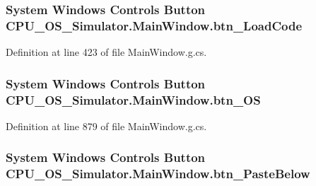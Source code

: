 \subsubsection[{btn\+\_\+\+Load\+Code}]{\setlength{\rightskip}{0pt plus 5cm}System Windows Controls Button C\+P\+U\+\_\+\+O\+S\+\_\+\+Simulator.\+Main\+Window.\+btn\+\_\+\+Load\+Code\hspace{0.3cm}{\ttfamily [package]}}\label{class_c_p_u___o_s___simulator_1_1_main_window_aaa08339ccd746254bf2429cae1fe8921}


Definition at line 423 of file Main\+Window.\+g.\+cs.

\hypertarget{class_c_p_u___o_s___simulator_1_1_main_window_a85c48da4a6e5ccef782c998f73fd1aa6}{}
\subsubsection[{btn\+\_\+\+O\+S}]{\setlength{\rightskip}{0pt plus 5cm}System Windows Controls Button C\+P\+U\+\_\+\+O\+S\+\_\+\+Simulator.\+Main\+Window.\+btn\+\_\+\+O\+S\hspace{0.3cm}{\ttfamily [package]}}\label{class_c_p_u___o_s___simulator_1_1_main_window_a85c48da4a6e5ccef782c998f73fd1aa6}


Definition at line 879 of file Main\+Window.\+g.\+cs.

\hypertarget{class_c_p_u___o_s___simulator_1_1_main_window_a1c24521ff648d75bf5991567e1a85b55}{}
\subsubsection[{btn\+\_\+\+Paste\+Below}]{\setlength{\rightskip}{0pt plus 5cm}System Windows Controls Button C\+P\+U\+\_\+\+O\+S\+\_\+\+Simulator.\+Main\+Window.\+btn\+\_\+\+Paste\+Below\hspace{0.3cm}{\ttfamily [package]}}\label{class_c_p_u___o_s___simulator_1_1_main_window_a1c24521ff648d75bf5991567e1a85b55}


